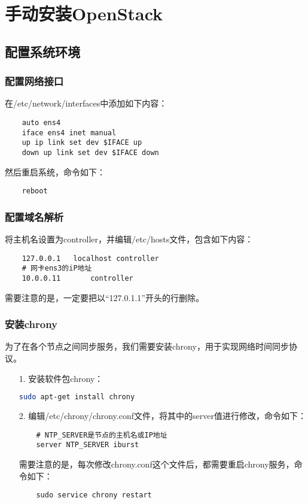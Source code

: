 \documentclass[a4paper,left=2.5cm,right=2.5cm,11pt]{article}
\begin{document}

\clearpage

\section{手动安装OpenStack}

\subsection{配置系统环境}
\subsubsection{配置网络接口}
	在/etc/network/interfaces中添加如下内容：
	\begin{lstlisting}
	auto ens4
	iface ens4 inet manual
	up ip link set dev $IFACE up
	down up link set dev $IFACE down
	\end{lstlisting}	

	然后重启系统，命令如下：
	\begin{lstlisting}
	reboot
	\end{lstlisting}

\subsubsection{配置域名解析}
	将主机名设置为controller，并编辑/etc/hosts文件，包含如下内容：
	\begin{lstlisting}
	127.0.0.1	localhost controller
	# 网卡ens3的iP地址
	10.0.0.11       controller
	\end{lstlisting}

	需要注意的是，一定要把以“127.0.1.1”开头的行删除。

\subsubsection{安装chrony}
	为了在各个节点之间同步服务，我们需要安装chrony，用于实现网络时间同步协议。
	\begin{itemize}
		\item[1.] 安装软件包chrony：
		\begin{lstlisting}[language = bash]
	sudo apt-get install chrony
		\end{lstlisting}

		\item[2.] 编辑/etc/chrony/chrony.conf文件，将其中的server值进行修改，命令如下：
		\begin{lstlisting}
	# NTP_SERVER是节点的主机名或IP地址
	server NTP_SERVER iburst
		\end{lstlisting}

		需要注意的是，每次修改chrony.conf这个文件后，都需要重启chrony服务，命令如下：
		\begin{lstlisting}
	sudo service chrony restart
		\end{lstlisting}
	\end{itemize}
\end{document}
